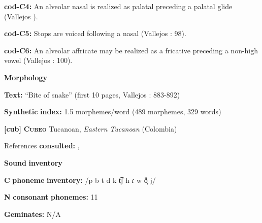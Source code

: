 \documentclass[output=paper]{langsci/langscibook}
\begin{document}
\begin{styleBody}
\textbf{cod-C4:} An alveolar nasal is realized as palatal preceding a palatal glide (Vallejos \citealt{Yopán2010}).
\end{styleBody}

\begin{styleBody}
\textbf{cod-C5:} Stops are voiced following a nasal (Vallejos \citealt{Yopán2010}: 98).
\end{styleBody}

\begin{styleBody}
\textbf{cod-C6:} An alveolar affricate may be realized as a fricative preceding a non-high vowel (Vallejos \citealt{Yopán2010}: 100).
\end{styleBody}

\begin{styleBody}
\textbf{Morphology}
\end{styleBody}

\begin{styleBody}
\textbf{Text:} “Bite of snake” (first 10 pages, Vallejos \citealt{Yopán2010}: 883-892)
\end{styleBody}

\begin{styleBody}
\textbf{Synthetic} \textbf{index:} 1.5 morphemes/word (489 morphemes, 329 words)
\end{styleBody}

\begin{styleBody}
\textbf{[cub]}   \textbf{\textsc{Cubeo}}    Tucanoan, \textit{Eastern} \textit{Tucanoan} (Colombia)
\end{styleBody}

\begin{styleBody}
References \textbf{consulted:} \citet{Chacon2012}, \citet{MorseMaxwell1999}
\end{styleBody}

\begin{styleBody}
\textbf{Sound} \textbf{inventory}
\end{styleBody}

\begin{styleBody}
\textbf{C} \textbf{phoneme} \textbf{inventory:} /p b t d k t͡ʃ h ɾ w ð̞ j/
\end{styleBody}

\begin{styleBody}
\textbf{N} \textbf{consonant} \textbf{phonemes:} 11
\end{styleBody}

\begin{styleBody}
\textbf{Geminates:} N/A
\end{styleBody}
\end{document}
